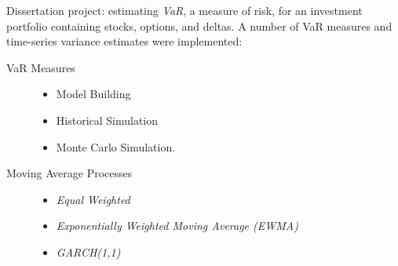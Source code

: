 \documentclass[letterpaper,11pt]{article}
\begin{document}
\begin{description}[style=multiline,leftmargin=3cm]
	\item[Value at Risk \textnormal{\tiny
		      \href{https://adrian.ng/java/var/}{adrian.ng/java/var/}}]
	      Dissertation project: estimating \textit{VaR}, a measure of risk, for an investment portfolio containing stocks, options, and deltas. A number of VaR measures and time-series variance estimates were implemented:
	      \begin{multicols}{2}
		      \begin{description}
			      \item[VaR Measures]
			            \hfill
			            \begin{itemize}
				            \item Model Building
				            \item Historical Simulation
				            \item Monte Carlo Simulation.
			            \end{itemize}
			            \columnbreak
			      \item[Moving Average Processes]
			            \hfill
			            \begin{itemize}
				            \item \textit{Equal Weighted}
				            \item \textit{Exponentially Weighted Moving Average (EWMA)}
				            \item \textit{GARCH(1,1)}
			            \end{itemize}
		      \end{description}
	      \end{multicols}


\end{description}
\end{document}
